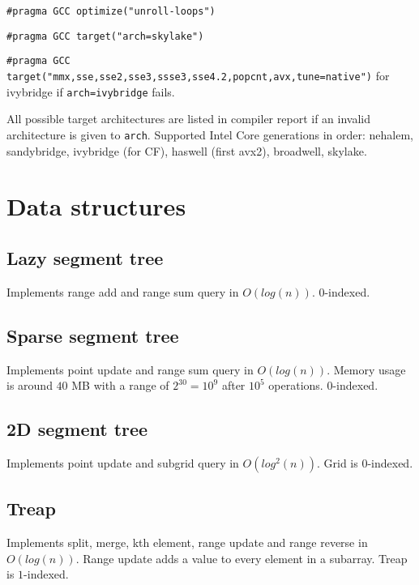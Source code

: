 \documentclass{article}
\begin{document}
\texttt{\#pragma GCC optimize("unroll-loops")}

\texttt{\#pragma GCC target("arch=skylake")}

\texttt{\#pragma GCC target("mmx,sse,sse2,sse3,ssse3,sse4.2,popcnt,avx,tune=native")} for ivybridge if \texttt{arch=ivybridge} fails.

All possible target architectures are listed in compiler report if an invalid architecture is given to \texttt{arch}. Supported Intel Core generations in order: nehalem, sandybridge, ivybridge (for CF), haswell (first avx2), broadwell, skylake.

\section{Data structures}

\subsection{Lazy segment tree}

Implements range add and range sum query in $O(log(n))$. $0$-indexed.



\subsection {Sparse segment tree}

Implements point update and range sum query in $O(log (n))$. Memory usage is around $40$ MB with a range of $2^{30} = 10^9$ after $10^5$ operations. $0$-indexed.



\subsection {2D segment tree}

Implements point update and subgrid query in $O(log^2(n))$. Grid is $0$-indexed.



\subsection {Treap}

Implements split, merge, kth element, range update and range reverse in $O(log(n))$. Range update adds a value to every element in a subarray. Treap is $1$-indexed.
\end{document}
